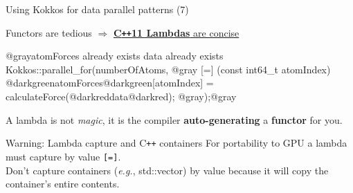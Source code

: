 \begin{frame}[fragile]{Using Kokkos for data parallel patterns (7)}

  Functors are tedious $\Rightarrow$ \ul{\textbf{C\texttt{++}11 Lambdas} are concise}

  \vspace{5pt}

  \begin{code}[linebackgroundcolor={
        \btLstHL<1->{4-6}{black!15}
      },
      keywords={}, frame=single]
@grayatomForces already exists
data already exists
Kokkos::parallel_for(numberOfAtoms, @gray
    [=] (const int64_t atomIndex) {
    @darkgreenatomForces@darkgreen[atomIndex] = calculateForce(@darkreddata@darkred);
  }
@gray);@gray
  \end{code}

  \pause

  A lambda is not \textit{magic}, it is the compiler \textbf{auto-generating} a \textbf{functor} for you.

  \pause
  \vspace{7pt}

  \begin{alertblock}{Warning: Lambda capture and C\texttt{++} containers}
    For portability to GPU a lambda must capture by value \texttt{[=]}. \\
    Don't capture containers (\textit{e.g.}, std::vector)
    by value because it will copy the container's entire contents.
  \end{alertblock}


\end{frame}


